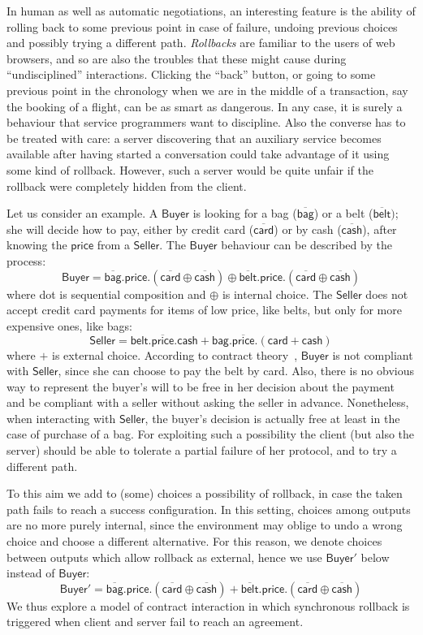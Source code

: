 \documentclass[UKenglish]{eptcs}
\newcommand{\Bag}{\textsf{bag}}
\newcommand{\DBag}{\Dual{\Bag}}
\newcommand{\Belt}{\textsf{belt}}
\newcommand{\DBelt}{\Dual{\Belt}}
\newcommand{\Price}{\textsf{price}}
\newcommand{\DPrice}{\Dual{\Price}}
\newcommand{\Card}{\textsf{card}}
\newcommand{\DCard}{\Dual{\Card}}
\newcommand{\Cash}{\textsf{cash}}
\newcommand{\DCash}{\Dual{\Cash}}
\newcommand{\Dual}[1]{\overline{#1}}
\begin{document}
In human as well as  automatic negotiations, an interesting feature is the ability of rolling back to some previous point in case of failure, undoing previous choices and  possibly trying a different path. {\em Rollbacks} are familiar to the users of web browsers, and so are also the troubles that these might cause during ``undisciplined'' interactions. Clicking the ``back'' button, or going to some previous point in the chronology when we are in the middle of a transaction, say the booking of a flight, can be as smart as dangerous. In any case, it is surely a behaviour that service programmers want to discipline. Also the converse has to be treated with care: a server discovering that an auxiliary service becomes available after having started a conversation could take advantage of it using some kind of rollback. However, such a server would be quite unfair if the rollback were completely hidden from the client. 

Let us consider an example.
A $\textsf{Buyer}$ is looking for a bag ($\DBag$) or a belt ($\DBelt)$; she will decide how to pay, either by credit card ($\DCard$) or by cash ($\DCash$), after knowing the $\Price$ from a $\textsf{Seller}$. The $\textsf{Buyer}$ behaviour can be described by the process:
\[\textsf{Buyer} = \DBag.\Price.(\DCard \oplus \DCash) \oplus \DBelt. \Price.(\DCard \oplus \DCash)\]
where dot is sequential composition and $\oplus$ is internal choice. 
The $\textsf{Seller}$ does not accept credit card payments for items of low price, like belts, but only for more expensive ones, like bags:
\[\textsf{Seller} = \Belt. \DPrice.\Cash + \Bag.\DPrice.(\Card + \Cash) \]
where $+$ is external choice.
According to contract theory~\cite{CGP10}, $\textsf{Buyer}$ is not compliant with $\textsf{Seller}$, since she can choose to pay the belt by card. Also, there is no obvious way to represent the buyer's will to be free in her decision about the payment and be compliant with a seller without asking the seller in advance. Nonetheless, when interacting with $\textsf{Seller}$, the buyer's decision is actually free at least in the case of purchase of a bag. For exploiting such a possibility the client (but also the server) should be able to tolerate a partial failure of her protocol, and to try a different path. 

To this aim we add to (some) choices a possibility of rollback, in
case the taken path fails to reach a success configuration. In
this setting, choices among outputs are no more purely internal, since
the environment may oblige to undo a wrong choice and choose a
different alternative. For this reason, we denote choices between outputs which allow rollback as external, hence we use $\textsf{Buyer}'$ below instead of $\textsf{Buyer}$:
\[\textsf{Buyer}' = \DBag.\Price.(\DCard \oplus \DCash) + \DBelt. \Price.(\DCard \oplus \DCash)\]
We thus explore a model of contract interaction in which synchronous
rollback is triggered when client and server fail to reach an agreement.
\end{document}
